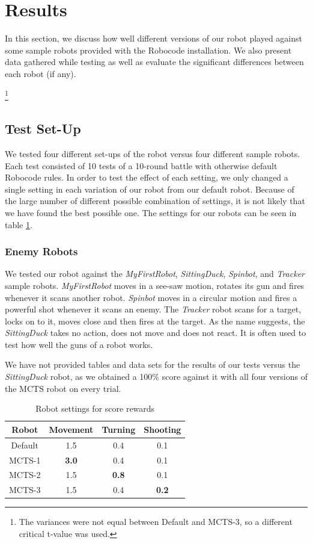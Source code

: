 \section{Results}
\label{05}
In this section, we discuss how well different versions of our robot played against some sample robots provided with the Robocode installation. We also present data gathered while testing as well as evaluate the significant differences between each robot (if any).

\footnote{The variances were not equal between Default and MCTS-3, so a different critical t-value was used.}

\subsection{Test Set-Up}
We tested four different set-ups of the robot versus four different sample robots. Each test consisted of 10 tests of a 10-round battle with otherwise default Robocode rules. In order to test the effect of each setting, we only changed a single setting in each variation of our robot from our default robot. Because of the large number of different possible combination of settings, it is not likely that we have found the best possible one. The settings for our robots can be seen in table \ref{table-robotsettings}.

\subsubsection{Enemy Robots} 
We tested our robot against the \textit{MyFirstRobot}, \textit{SittingDuck}, \textit{Spinbot}, and \textit{Tracker} sample robots. \textit{MyFirstRobot} moves in a see-saw motion, rotates its gun and fires whenever it scans another robot. \textit{Spinbot} moves in a circular motion and fires a powerful shot whenever it scans an enemy. The \textit{Tracker} robot scans for a target, locks on to it, moves close and then fires at the target. As the name suggests, the \textit{SittingDuck} takes no action, does not move and does not react. It is often used to test how well the guns of a robot works.

We have not provided tables and data sets for the results of our tests versus the \textit{SittingDuck} robot, as we obtained a 100\% score against it with all four versions of the MCTS robot on every trial. 

\begin{table}
\begin{center}
\renewcommand{\arraystretch}{1}
\caption{Robot settings for score rewards}
\label{table-robotsettings}
\begin{tabular}{|c | c | c |c |}
\hline
Robot & Movement & Turning & Shooting\\
\hline
Default & 1.5 & 0.4 & 0.1\\
\hline
MCTS-1 & \textbf{3.0} & 0.4 & 0.1\\
\hline
MCTS-2 & 1.5 & \textbf{0.8} & 0.1\\
\hline
MCTS-3 & 1.5 & 0.4 & \textbf{0.2}\\
\hline
\end{tabular}
\end{center}
\end{table}

